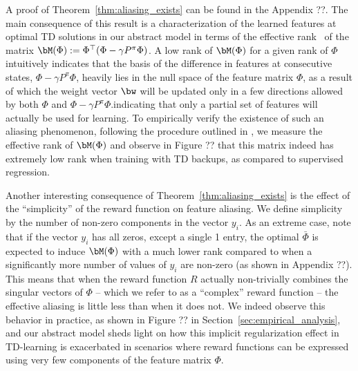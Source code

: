 A proof of Theorem~\ref{thm:aliasing_exists} can be found in the Appendix ??. The main consequence of this result is a characterization of the learned features at optimal TD solutions in our abstract model in terms of the effective rank~\citep{kumar2021implicit} of the matrix $\bM(\Phi) := \Phi^\top (\Phi - \gamma P^\pi \Phi)$. A low rank of $\bM(\Phi)$ for a given rank of $\Phi$ intuitively indicates that the basis of the difference in features at consecutive states, $\Phi - \gamma P^\pi \Phi$, heavily lies
in the null space of the feature matrix $\Phi$, as a result of which the weight vector $\bw$ will be updated only in a few directions allowed by both $\Phi$ and $\Phi-\gamma P^\pi \Phi$.indicating that only a partial set of features will actually be used for learning.
To empirically verify the existence of such an aliasing phenomenon, following the procedure outlined in \citep{kumar2021implicit}, we measure the effective rank of $\bM(\Phi)$ and observe in Figure ?? that this matrix indeed has extremely low rank when training with TD backups, as compared to supervised regression.

Another interesting consequence of Theorem~\ref{thm:aliasing_exists} is the effect of the ``simplicity'' of the reward function on feature aliasing. We define simplicity by the number of non-zero components in the vector $y_i$.
As an extreme case, note that if the vector $y_i$ has all zeros, except a single 1 entry, the optimal $\bar{\Phi}$ is expected to induce $\bM(\Phi)$ with a much lower rank compared to when a significantly more number of values of $y_i$ are non-zero (as shown in Appendix ??).
This means that when the reward function $R$ actually non-trivially combines the singular vectors of $\Phi$ -- which we refer to as a ``complex'' reward function -- the effective aliasing
is little less than when it does not. We indeed observe this behavior in practice, as shown in Figure ?? in Section~\ref{sec:empirical_analysis}, and our abstract model sheds light on how this implicit regularization effect in TD-learning is exacerbated in scenarios where reward functions can be expressed using very few components of the feature matrix $\Phi$.

